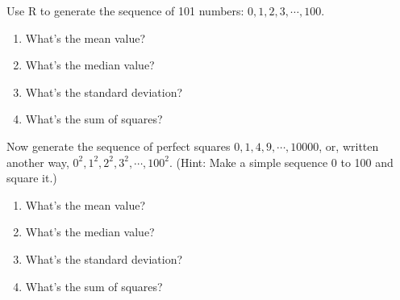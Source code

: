 
Use R to generate the sequence of 101 numbers: $0, 1, 2, 3, \cdots, 100$.

\begin{enumerate}

\item What's the mean value?\\

\item What's the median value?\\

\item What's the standard deviation?\\

\item What's the sum of squares?\\
\end{enumerate}

Now generate the sequence of perfect squares $0, 1, 4, 9, \cdots, 10000$,
or, written another way, $0^2, 1^2, 2^2, 3^2, \cdots, 100^2$.  (Hint:
Make a simple sequence 0 to 100 and square it.)

\begin{enumerate}

\item What's the mean value?\\ 

\item What's the median value?\\

\item What's the standard deviation?\\ 

\item What's the sum of squares?\\
\end{enumerate}